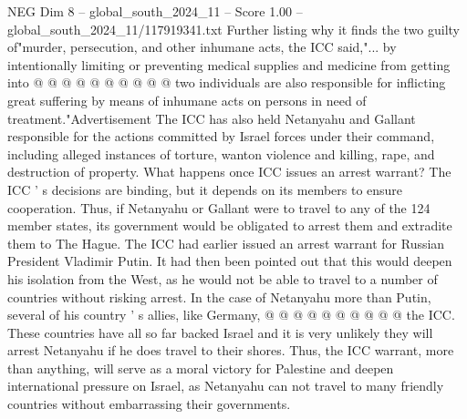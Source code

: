 \begin{textsample}{NEG Dim 8 – global\_south\_2024\_11 – Score 1.00 – global\_south\_2024\_11/117919341.txt}
Further listing why it finds the two guilty of"murder, persecution, and other inhumane acts, the ICC said,"... by intentionally limiting or preventing medical supplies and medicine from getting into @ @ @ @ @ @ @ @ @ @ two individuals are also responsible for inflicting great suffering by means of inhumane acts on persons in need of treatment."Advertisement The ICC has also held Netanyahu and Gallant responsible for the actions committed by Israel forces under their command, including alleged instances of torture, wanton violence and killing, rape, and destruction of property.
What happens once ICC issues an arrest warrant?
The ICC ' s decisions are binding, but it depends on its members to ensure cooperation.
Thus, if Netanyahu or Gallant were to travel to any of the 124 member states, its government would be obligated to arrest them and extradite them to The Hague.
The ICC had earlier issued an arrest warrant for Russian President Vladimir Putin.
It had then been pointed out that this would deepen his isolation from the West, as he would not be able to travel to a number of countries without risking arrest.
In the case of Netanyahu more than Putin, several of his country ' s allies, like Germany, @ @ @ @ @ @ @ @ @ @ the ICC.
These countries have all so far backed Israel and it is very unlikely they will arrest Netanyahu if he does travel to their shores.
Thus, the ICC warrant, more than anything, will serve as a moral victory for Palestine and deepen international pressure on Israel, as Netanyahu can not travel to many friendly countries without embarrassing their governments.

\end{textsample}
